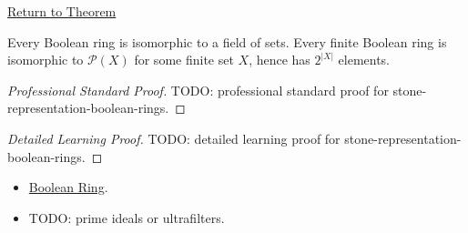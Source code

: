 \newpage
{}
\label{prf:stone-representation-boolean-rings}

\begin{remark*}[Return]
\hyperref[thm:stone-representation-boolean-rings]{Return to Theorem}
\end{remark*}

\begin{theorem*}
Every Boolean ring is isomorphic to a field of sets. Every finite Boolean
ring is isomorphic to $\mathcal P(X)$ for some finite set $X$, hence has
$2^{|X|}$ elements.
\end{theorem*}

\begin{proof}[Professional Standard Proof]
\LRAProofBodyStart
TODO: professional standard proof for stone-representation-boolean-rings.
\end{proof}

\begin{proof}[Detailed Learning Proof]
\LRAProofBodyStart
TODO: detailed learning proof for stone-representation-boolean-rings.
\end{proof}

\begin{remark*}
\end{remark*}

\begin{dependencies}
\begin{itemize}
  \item \hyperref[def:boolean-ring]{Boolean Ring}.
  \item TODO: prime ideals or ultrafilters.
\end{itemize}
\end{dependencies}

\clearpage
